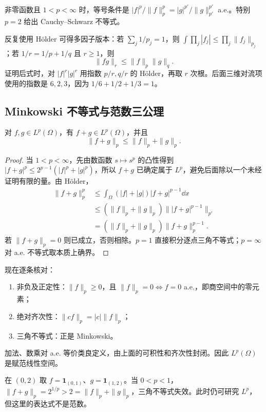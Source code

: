 非零函数且 $1<p<\infty$ 时，等号条件是 $|f|^p/\|f\|_p^p=|g|^{p'}/\|g\|_{p'}^{p'}$ a.e.。特别 $p=2$ 给出 Cauchy--Schwarz 不等式。

反复使用 H\"older 可得多因子版本：若 $\sum_j1/p_j=1$，则 $\int\prod_j|f_j|\le\prod_j\|f_j\|_{p_j}$；若 $1/r=1/p+1/q$ 且 $r\ge1$，则
\begin{equation}
 \|fg\|_r\le\|f\|_p\|g\|_q.
 \label{eq:lp-product}
\end{equation}
证明后式时，对 $|f|^r|g|^r$ 用指数 $p/r,q/r$ 的 H\"older，再取 $r$ 次根。后面三维对流项使用的指数是 $6,2,3$，因为 $1/6+1/2+1/3=1$。

\subsection{Minkowski 不等式与范数三公理}

\begin{theorem}\label{thm:lp-minkowski}
对 $f,g\in L^p(\Omega)$，有 $f+g\in L^p(\Omega)$，并且
\begin{equation}
 \boxed{\|f+g\|_p\le\|f\|_p+\|g\|_p.}
 \label{eq:lp-minkowski}
\end{equation}
\end{theorem}
\begin{proof}
当 $1<p<\infty$，先由数函数 $s\mapsto s^p$ 的凸性得到
$|f+g|^p\le2^{p-1}(|f|^p+|g|^p)$，所以 $f+g$ 已确定属于 $L^p$，避免后面除以一个未经证明有限的量。由 H\"older，
\begin{align*}
 \|f+g\|_p^p
 &\le\int_\Omega (|f|+|g|)|f+g|^{p-1}\dd x\\
 &\le(\|f\|_p+\|g\|_p)
 \big\||f+g|^{p-1}\big\|_{p'}\\
 &=(\|f\|_p+\|g\|_p)\|f+g\|_p^{p-1}.
\end{align*}
若 $\|f+g\|_p=0$ 则已成立，否则相除。$p=1$ 直接积分逐点三角不等式；$p=\infty$ 对 a.e. 不等式取本质上确界。
\end{proof}

现在逐条核对：
\begin{enumerate}
 \item 非负及正定性：$\|f\|_p\ge0$，且 $\|f\|_p=0\iff f=0$ a.e.，即商空间中的零元素；
 \item 绝对齐次性：$\|cf\|_p=|c|\|f\|_p$；
 \item 三角不等式：正是 Minkowski。
\end{enumerate}
加法、数乘对 a.e. 等价类良定义，由上面的可积性和齐次性封闭。因此 $L^p(\Omega)$ 是赋范线性空间。

\begin{example}[为什么通常限制 $p\ge1$]
在 $(0,2)$ 取 $f=\mathbf1_{(0,1)}$、$g=\mathbf1_{(1,2)}$。当 $0<p<1$，$\|f+g\|_p=2^{1/p}>2=\|f\|_p+\|g\|_p$，三角不等式失效。此时仍可研究 $L^p$，但这里的表达式不是范数。
\end{example}

